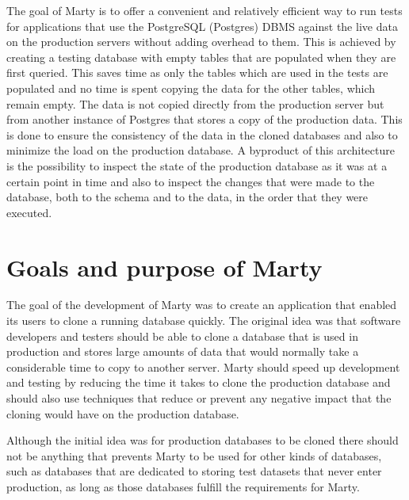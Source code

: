 \documentclass[a4paper,12pt,twoside,BCOR=10mm]{scrbook}
\begin{document}
The goal of Marty is to offer a convenient and relatively efficient way to run tests for applications that use the PostgreSQL (Postgres) DBMS against the live data on the production servers without adding overhead to them. This is achieved by creating a testing database with empty tables that are populated  when they are first queried. This saves time as only the tables which are used in the tests are populated and no time is spent copying the data for the other tables, which remain empty. The data is not copied directly from the production server but from another instance of Postgres that stores a copy of the production data. This is done to ensure the consistency of the data in the cloned databases and also to minimize the load on the production database. A byproduct of this architecture is the possibility to inspect the state of the production database as it was at a certain point in time and also to inspect the changes that were made to the database, both to the schema and to the data, in the order that they were executed.


\chapter{Goals and purpose of Marty}
The goal of the development of Marty was to create an application that enabled its users to clone a running database quickly. The original idea was that software developers and testers should be able to clone a database that is used in production and stores large amounts of data that would normally take a considerable time to copy to another server. Marty should speed up development and testing by reducing the time it takes to clone the production database and should also use techniques that reduce or prevent any negative impact that the cloning would have on the production database. 

Although the initial idea was for production databases to be cloned there should not be anything that prevents Marty to be used for other kinds of databases, such as databases that are dedicated to storing test datasets that never enter production, as long as those databases fulfill the requirements for Marty.
\end{document}
